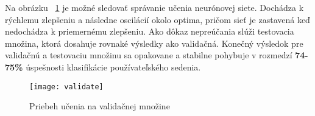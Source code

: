 Na obrázku ~\ref{fig:validate} je možné sledovať správanie učenia neurónovej siete. Dochádza k rýchlemu zlepšeniu a následne oscilácií okolo optima, pričom sieť je zastavená keď nedochádza k priemernému zlepšeniu. Ako dôkaz nepreúčania slúži testovacia množina, ktorá dosahuje rovnaké výsledky ako validačná. Konečný výsledok pre validačnú a testovaciu množinu sa opakovane a stabilne pohybuje v rozmedzí \textbf{74-75\%} úspešnosti klasifikácie používateľského sedenia.

\begin{figure}[H]
	\begin{center}
		\texttt{[image: validate]}\end{center}
	\caption[validate]{Priebeh učenia na validačnej množine}
	\label{fig:validate}
\end{figure}

